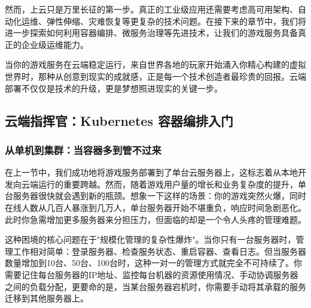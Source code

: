 然而，上云只是万里长征的第一步。真正的工业级应用还需要考虑高可用架构、自动化运维、弹性伸缩、灾难恢复等更复杂的技术问题。在接下来的章节中，我们将进一步探索如何利用容器编排、微服务治理等先进技术，让我们的游戏服务具备真正的企业级运维能力。

当你的游戏服务在云端稳定运行，来自世界各地的玩家开始涌入你精心构建的虚拟世界时，那种从创意到现实的成就感，正是每一个技术创造者最珍贵的回报。云端部署不仅仅是技术的升级，更是梦想照进现实的关键一步。


\subsection{云端指挥官：Kubernetes 容器编排入门}

\subsubsection{从单机到集群：当容器多到管不过来}

在上一节中，我们成功地将游戏服务部署到了单台云服务器上，这标志着从本地开发向云端运行的重要跨越。然而，随着游戏用户量的增长和业务复杂度的提升，单台服务器很快就会遇到新的瓶颈。想象一下这样的场景：你的游戏突然火爆，同时在线人数从几百人暴涨到几万人，单台服务器开始不堪重负，响应时间急剧恶化。此时你急需增加更多服务器来分担压力，但面临的却是一个令人头疼的管理难题。

这种困境的核心问题在于"规模化管理的复杂性爆炸"。当你只有一台服务器时，管理工作相对简单：登录服务器、检查服务状态、重启容器、查看日志。但当服务器数量增加到10台、50台、100台时，这种一对一的管理方式就完全不可持续了。你需要记住每台服务器的IP地址、监控每台机器的资源使用情况、手动协调服务器之间的负载分配，更要命的是，当某台服务器宕机时，你需要手动将其承载的服务迁移到其他服务器上。

